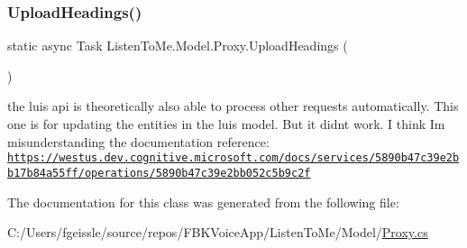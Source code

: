 \subsubsection{\texorpdfstring{Upload\+Headings()}{UploadHeadings()}}
{\footnotesize\ttfamily static async Task Listen\+To\+Me.\+Model.\+Proxy.\+Upload\+Headings (\begin{DoxyParamCaption}{ }\end{DoxyParamCaption})\hspace{0.3cm}{\ttfamily [static]}}



the luis api is theoretically also able to process other requests automatically. This one is for updating the entities in the luis model. But it didn\textquotesingle{}t work. I think I\textquotesingle{}m misunderstanding the documentation reference\+: \href{https://westus.dev.cognitive.microsoft.com/docs/services/5890b47c39e2bb17b84a55ff/operations/5890b47c39e2bb052c5b9c2f}{\tt https\+://westus.\+dev.\+cognitive.\+microsoft.\+com/docs/services/5890b47c39e2bb17b84a55ff/operations/5890b47c39e2bb052c5b9c2f} 



The documentation for this class was generated from the following file\+:\begin{DoxyCompactItemize}
\item 
C\+:/\+Users/fgeissle/source/repos/\+F\+B\+K\+Voice\+App/\+Listen\+To\+Me/\+Model/\mbox{\hyperlink{_proxy_8cs}{Proxy.\+cs}}\end{DoxyCompactItemize}
